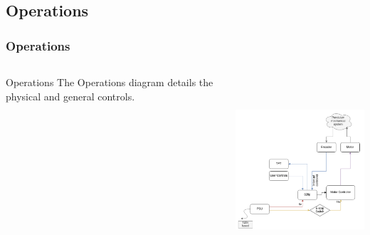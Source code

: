 \documentclass[aspectratio=169]{beamer}
\begin{document}
\subsection{Operations}
\begin{frame}
    \frametitle{Operations}

    \begin{columns}
        \begin{column}{0.30\textwidth}
            \begin{block}{Operations}
                The Operations diagram details the physical and general controls.
            \end{block}
        \end{column}

        \begin{column}{0.70\textwidth}
            \includegraphics[height=7cm]{Operations}
        \end{column}
    \end{columns}


\end{frame}
\end{document}
